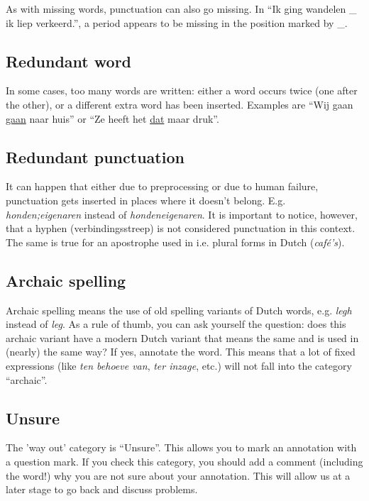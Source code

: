 \documentclass[a4paper,11pt]{article}
\begin{document}
As with missing words, punctuation can also go missing. In ``Ik ging
wandelen \_ ik liep verkeerd.'', a period appears to be missing in the
position marked by \_.

\subsection{Redundant word}

In some cases, too many words are written: either a word occurs twice
(one after the other), or a different extra word has been inserted.
Examples are ``Wij gaan \underline{gaan} naar huis'' or ``Ze heeft het
\underline{dat} maar druk''. 

\subsection{Redundant punctuation}

It can happen that either due to preprocessing or due to human
failure, punctuation gets inserted in places where it doesn't belong.
E.g. \emph{honden;eigenaren} instead of \emph{hondeneigenaren}. It is
important to notice, however, that a hyphen (verbindingsstreep) is not
considered punctuation in this context. The same is true for an
apostrophe used in i.e.  plural forms in Dutch (\emph{caf\'e's}).

\subsection{Archaic spelling}

Archaic spelling means the use of old spelling variants of Dutch
words, e.g.  \emph{legh} instead of \emph{leg}. As a rule of thumb,
you can ask yourself the question: does this archaic variant have a
modern Dutch variant that means the same and is used in (nearly) the
same way? If yes, annotate the word. This means that a lot of fixed
expressions (like \emph{ten behoeve van}, \emph{ter inzage}, etc.)
will not fall into the category ``archaic''.

\subsection{Unsure}

The 'way out' category is ``Unsure''. This allows you to
mark an annotation with a question mark. If you check this category,
you should add a comment (including the word!) why you are not sure
about your annotation.  This will allow us at a later stage to go back
and discuss problems.
\end{document}
